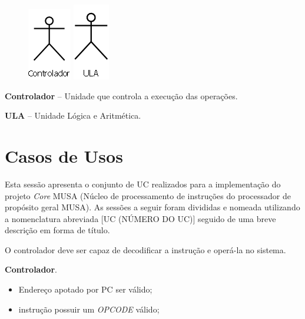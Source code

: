 \documentclass{article}
\begin{document}
\begin{figure}[htb]
\centering
\begin{minipage}[c]{0.19\linewidth}
\centering
\includegraphics[scale=0.50]{./pictures/use/atores/controlador.png}
\end{minipage}
\begin{minipage}[c]{0.19\linewidth}
\centering
\includegraphics[scale=0.50]{./pictures/use/atores/ula.png}
\end{minipage}
\end{figure}

\textbf{Controlador} – Unidade que controla a execução das operações.

\textbf{ULA} – Unidade L\'{o}gica e Aritm\'{e}tica.
  
  \section{Casos de Usos}
  Esta sessão apresenta o conjunto de UC realizados para a implementação do projeto \textit{Core }MUSA (Núcleo de processamento de instruções do processador de propósito geral MUSA). As sessões a seguir foram divididas e nomeada utilizando a nomenclatura abreviada [UC (NÚMERO DO UC)] seguido de uma breve descrição em forma de título.

  O controlador deve ser capaz de decodificar a instrução e operá-la no sistema.
  
  \actors
    \begin{description}
     \item \textbf{Controlador}.
    \end{description}
    
  \preconditions 
    \begin{itemize}
     \item Endereço apotado por PC ser válido;
     \item instrução possuir um \textit{OPCODE} válido;
    \end{itemize}
\end{document}

